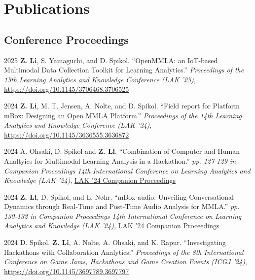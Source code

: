 \documentclass[11pt,letterpaper]{report}
\begin{document}
    \section*{Publications}

    \subsection*{Conference Proceedings}

    \begin{tablist}

        \item[2025] \tab{} \textbf{Z. Li}, S. Yamaguchi, and D. Spikol. \enquote{OpenMMLA: an IoT-based Multimodal Data Collection Toolkit for Learning Analytics.} \textit{Proceedings of the 15th Learning Analytics and Knowledge Conference (LAK '25)}, \href{https://doi.org/10.1145/3706468.3706525}{https://doi.org/10.1145/3706468.3706525}
        \item[2024] \tab{} \textbf{Z. Li}, M. T. Jensen, A. Nolte, and D. Spikol. \enquote{Field report for Platform mBox: Designing an Open MMLA Platform.} \textit{Proceedings of the 14th Learning Analytics and Knowledge Conference (LAK '24)}, \href{https://doi.org/10.1145/3636555.3636872}{https://doi.org/10.1145/3636555.3636872}
        \item[2024] \tab{} A. Ohsaki, D. Spikol and \textbf{Z. Li}. \enquote{Combination of Computer and Human Analtyics for Multimodal Learning Analysis in a Hackathon.} \textit{pp. 127-129 in Companion Proceedings 14th International Conference on Learning Analytics and Knowledge (LAK '24)}, \href{https://www.solaresearch.org/wp-content/uploads/2024/03/LAK24_CompanionProceedings.pdf}{LAK '24 Companion Proceedings}
        \item[2024] \tab{} \textbf{Z. Li}, D. Spikol, and L. Nøhr. \enquote{mBox-audio: Unveiling Conversational Dynamics through Real-Time and Post-Time Audio Analysis for MMLA.} \textit{pp. 130-132 in Companion Proceedings 14th International Conference on Learning Analytics and Knowledge (LAK '24)}, \href{https://www.solaresearch.org/wp-content/uploads/2024/03/LAK24_CompanionProceedings.pdf}{LAK '24 Companion Proceedings}
        \item[2024] \tab{} D. Spikol, \textbf{Z. Li}, A. Nolte, A. Ohsaki, and K. Rapur. \enquote{Investigating Hackathons with Collaboration Analytics.} \textit{Proceedings of the 8th International Conference on Game Jams, Hackathons and Game Creation Events (ICGJ '24)}, \href{https://doi.org/10.1145/3697789.3697797}{https://doi.org/10.1145/3697789.3697797}

\end{tablist}
\end{document}
